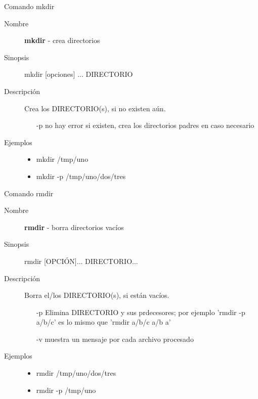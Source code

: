 \begin{frame}[c]{Comando mkdir}
  \begin{description}
    \item[Nombre]
      \textbf{mkdir} - crea directorios

    \vspace{\baselineskip}
    \item[Sinopsis]
      mkdir [opciones] ... DIRECTORIO

    \vspace{\baselineskip}
    \item[Descripción]
      Crea los DIRECTORIO(s), si no existen aún.

      \begin{itemize}
        \item [-p] no hay error si existen, crea los directorios
          padres en caso necesario
      \end{itemize}

    \vspace{\baselineskip}
    \item[Ejemplos]
      \begin{itemize}
        \item mkdir /tmp/uno
        \item mkdir -p /tmp/uno/dos/tres
      \end{itemize}
  \end{description}
\end{frame}

\begin{frame}[c]{Comando rmdir}
  \begin{description}
    \item[Nombre]
      \textbf{rmdir} - borra directorios vacíos

    \vspace{\baselineskip}
    \item[Sinopsis]
        rmdir [OPCIÓN]... DIRECTORIO...
      
    \vspace{\baselineskip}
    \item[Descripción]
      Borra el/los DIRECTORIO(s), si están vacíos.

      \begin{itemize}
        \item [-p] Elimina DIRECTORIO y sus prdecesores; por ejemplo
          'rmdir -p a/b/c' es lo mismo que 'rmdir a/b/c a/b a'
        \item [-v] muestra un mensaje por cada archivo procesado
      \end{itemize}

    \vspace{\baselineskip}
    \item[Ejemplos]
      \begin{itemize}
        \item rmdir /tmp/uno/dos/tres
        \item rmdir -p /tmp/uno
      \end{itemize}
  \end{description}
\end{frame}

